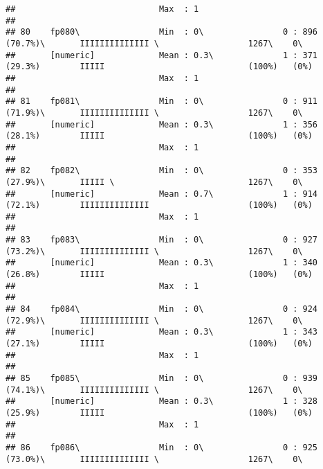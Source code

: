 \documentclass[]{article}
\begin{document}
\begin{verbatim}
##                             Max  : 1                                                                                            
## 
## 80    fp080\                Min  : 0\                0 : 896 (70.7%)\       IIIIIIIIIIIIII \                  1267\    0\       
##       [numeric]             Mean : 0.3\              1 : 371 (29.3%)        IIIII                             (100%)   (0%)     
##                             Max  : 1                                                                                            
## 
## 81    fp081\                Min  : 0\                0 : 911 (71.9%)\       IIIIIIIIIIIIII \                  1267\    0\       
##       [numeric]             Mean : 0.3\              1 : 356 (28.1%)        IIIII                             (100%)   (0%)     
##                             Max  : 1                                                                                            
## 
## 82    fp082\                Min  : 0\                0 : 353 (27.9%)\       IIIII \                           1267\    0\       
##       [numeric]             Mean : 0.7\              1 : 914 (72.1%)        IIIIIIIIIIIIII                    (100%)   (0%)     
##                             Max  : 1                                                                                            
## 
## 83    fp083\                Min  : 0\                0 : 927 (73.2%)\       IIIIIIIIIIIIII \                  1267\    0\       
##       [numeric]             Mean : 0.3\              1 : 340 (26.8%)        IIIII                             (100%)   (0%)     
##                             Max  : 1                                                                                            
## 
## 84    fp084\                Min  : 0\                0 : 924 (72.9%)\       IIIIIIIIIIIIII \                  1267\    0\       
##       [numeric]             Mean : 0.3\              1 : 343 (27.1%)        IIIII                             (100%)   (0%)     
##                             Max  : 1                                                                                            
## 
## 85    fp085\                Min  : 0\                0 : 939 (74.1%)\       IIIIIIIIIIIIII \                  1267\    0\       
##       [numeric]             Mean : 0.3\              1 : 328 (25.9%)        IIIII                             (100%)   (0%)     
##                             Max  : 1                                                                                            
## 
## 86    fp086\                Min  : 0\                0 : 925 (73.0%)\       IIIIIIIIIIIIII \                  1267\    0\       

\end{verbatim}
\end{document}
